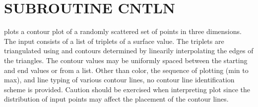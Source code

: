 \documentclass[11pt]{report}
\begin{document}
\newpage
\section{SUBROUTINE CNTLN}

 plots a contour plot of a randomly scattered set of points in
three dimensions.  The input consists of a list of triplets of a surface
value.  The triplets are triangulated using  and contours
determined by linearily interpolating the edges of the triangles.
The contour values may be uniformly spaced between the starting
and end values or from a list.  Other than color, the
sequence of plotting (min to max), and line typing of various contour
lines, no contour line identification scheme is provided.  Caution
should be exercised when interpreting plot since the distribution of
input points may affect the placement of the contour lines.
\end{document}
